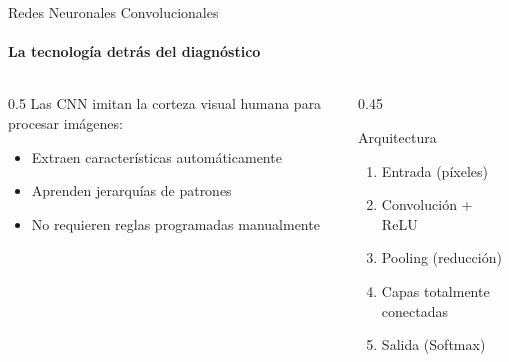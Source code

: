 \begin{frame}{Redes Neuronales Convolucionales}
\framesubtitle{La tecnología detrás del diagnóstico}

\begin{columns}[T]
\begin{column}{0.5\textwidth}
Las CNN imitan la \alert{corteza visual humana} para procesar imágenes:

\begin{itemize}
    \item Extraen características \alert{automáticamente}
    \item Aprenden jerarquías de patrones
    \item No requieren reglas programadas manualmente
\end{itemize}
\end{column}
\begin{column}{0.45\textwidth}
\begin{block}{\faCogs\; Arquitectura}
\begin{enumerate}
    \item Entrada (píxeles)
    \item Convolución + ReLU
    \item Pooling (reducción)
    \item Capas totalmente conectadas
    \item Salida (Softmax)
\end{enumerate}
\end{block}
\end{column}
\end{columns}

\end{frame}

